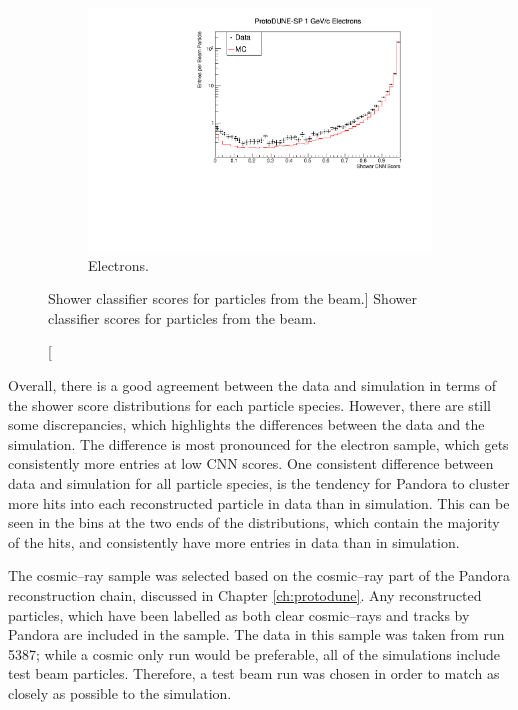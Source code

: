 \begin{figure}
	\begin{subfigure}[b]{0.68\textwidth}
		\centering
		\includegraphics[width=\textwidth]{figures/hit_cnn_electron.pdf}
		\caption {Electrons.}
		\label{fig:beam_electron_cnn}
	\end{subfigure}

	\caption
	[Shower classifier scores for particles from the \protodune{} beam.]
	{Shower classifier scores for particles from the \protodune{} beam.}

	\label{fig:cnn_scores_beam}

\end{figure}

Overall, there is a good agreement between the data and simulation in terms of
the shower score distributions for each particle species. However, there are
still some discrepancies, which highlights the differences between the data and
the simulation. The difference is most pronounced for the electron sample, which
gets consistently more entries at low CNN scores. One consistent difference
between data and simulation for all particle species, is the tendency for 
Pandora to cluster more hits into each reconstructed particle in data than in 
simulation. This can be seen in the bins at the two ends of the distributions,
which contain the majority of the hits, and consistently have more entries in 
data than in simulation.

The cosmic--ray sample was selected based on the cosmic--ray part of the
Pandora reconstruction chain, discussed in Chapter \ref{ch:protodune}. Any
reconstructed particles, which have been labelled as both clear cosmic--rays
and tracks by Pandora are included in the sample. The data in this sample was
taken from run 5387; while a cosmic only run would be preferable, all of the
\protodune{} simulations include test beam particles. Therefore, a test beam
run was chosen in order to match as closely as possible to the simulation.

